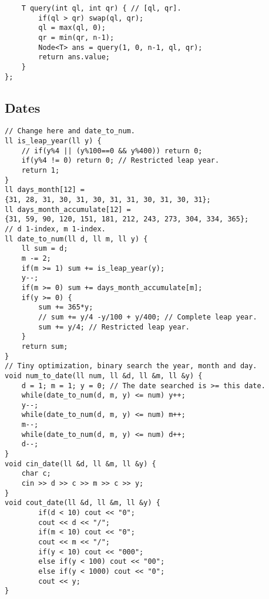 \documentclass[a4paper]{article}
\begin{document}
\begin{multicols}{2}
\begin{verbatim}
    T query(int ql, int qr) { // [ql, qr].
        if(ql > qr) swap(ql, qr);
        ql = max(ql, 0);
        qr = min(qr, n-1);
        Node<T> ans = query(1, 0, n-1, ql, qr);
        return ans.value;
    }
};
\end{verbatim}
\end{multicols}
\subsection*{Dates}
\begin{multicols}{2}
\begin{verbatim}
// Change here and date_to_num.
ll is_leap_year(ll y) {
    // if(y%4 || (y%100==0 && y%400)) return 0;
    if(y%4 != 0) return 0; // Restricted leap year.
    return 1;
}
ll days_month[12] = 
{31, 28, 31, 30, 31, 30, 31, 31, 30, 31, 30, 31};
ll days_month_accumulate[12] = 
{31, 59, 90, 120, 151, 181, 212, 243, 273, 304, 334, 365};
// d 1-index, m 1-index.
ll date_to_num(ll d, ll m, ll y) {
    ll sum = d;
    m -= 2;
    if(m >= 1) sum += is_leap_year(y);
    y--;
    if(m >= 0) sum += days_month_accumulate[m];
    if(y >= 0) {
        sum += 365*y;
        // sum += y/4 -y/100 + y/400; // Complete leap year.
        sum += y/4; // Restricted leap year.
    } 
    return sum;
}
// Tiny optimization, binary search the year, month and day.
void num_to_date(ll num, ll &d, ll &m, ll &y) {
    d = 1; m = 1; y = 0; // The date searched is >= this date.
    while(date_to_num(d, m, y) <= num) y++;
    y--;
    while(date_to_num(d, m, y) <= num) m++;
    m--;
    while(date_to_num(d, m, y) <= num) d++;
    d--;
}
void cin_date(ll &d, ll &m, ll &y) {
    char c;
    cin >> d >> c >> m >> c >> y;
}
void cout_date(ll &d, ll &m, ll &y) {
        if(d < 10) cout << "0";
        cout << d << "/";
        if(m < 10) cout << "0";
        cout << m << "/";
        if(y < 10) cout << "000";
        else if(y < 100) cout << "00";
        else if(y < 1000) cout << "0";
        cout << y;
}
\end{verbatim}
\end{multicols}
\end{document}
